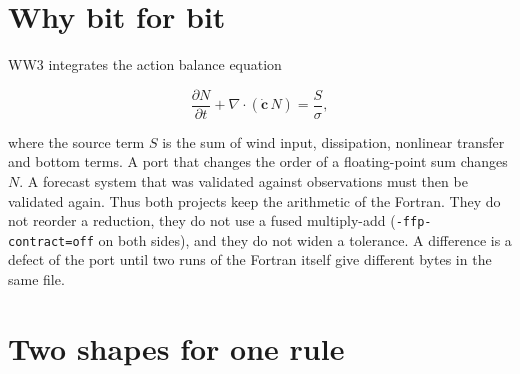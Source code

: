 \documentclass[10pt,a4paper,]{article}
\begin{document}
\section{Why bit for bit}\label{sec:why}

WW3 integrates the action balance equation

\[\frac{\partial N}{\partial t} + \nabla\cdot(\dot{\mathbf{c}}\,N) = \frac{S}{\sigma},\]

where the source term \(S\) is the sum of wind input, dissipation,
nonlinear transfer and bottom terms. A port that changes the order of a
floating-point sum changes \(N\). A forecast system that was validated
against observations must then be validated again. Thus both projects
keep the arithmetic of the Fortran. They do not reorder a reduction,
they do not use a fused multiply-add (\texttt{-ffp-contract=off} on both
sides), and they do not widen a tolerance. A difference is a defect of
the port until two runs of the Fortran itself give different bytes in
the same file.

\section{Two shapes for one rule}\label{sec:shapes}
\end{document}
